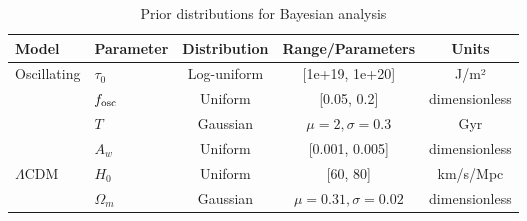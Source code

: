 \begin{table}[htbp]
\centering
\caption{Prior distributions for Bayesian analysis}
\begin{tabular}{llccc}
\hline
Model & Parameter & Distribution & Range/Parameters & Units \\
\hline
Oscillating & $\tau_0$ & Log-uniform & [1e+19, 1e+20] & J/m² \\
 & $f_{\rm osc}$ & Uniform & [0.05, 0.2] & dimensionless \\
 & $T$ & Gaussian & $\mu=2, \sigma=0.3$ & Gyr \\
 & $A_w$ & Uniform & [0.001, 0.005] & dimensionless \\
$\Lambda$CDM & $H_0$ & Uniform & [60, 80] & km/s/Mpc \\
 & $\Omega_m$ & Gaussian & $\mu=0.31, \sigma=0.02$ & dimensionless \\
\hline
\end{tabular}
\label{tab:priors}
\end{table}